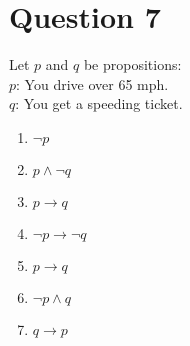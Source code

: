 \documentclass[12pt]{extarticle}
\begin{document}
\section*{Question 7}
	Let $p$ and $q$ be propositions:\\
		\hspace*{1cm}$p$: You drive over 65 mph.\\
		\hspace*{1cm}$q$: You get a speeding ticket.\\
	\begin{enumerate}
		\item $\neg p$
		\item $p \wedge \neg q$
		\item $p \to q$
		\item $\neg p \to \neg q$
		\item $p \to q$
		\item $\neg p \wedge q$
		\item $q \to p$
	\end{enumerate}
\clearpage
\end{document}
